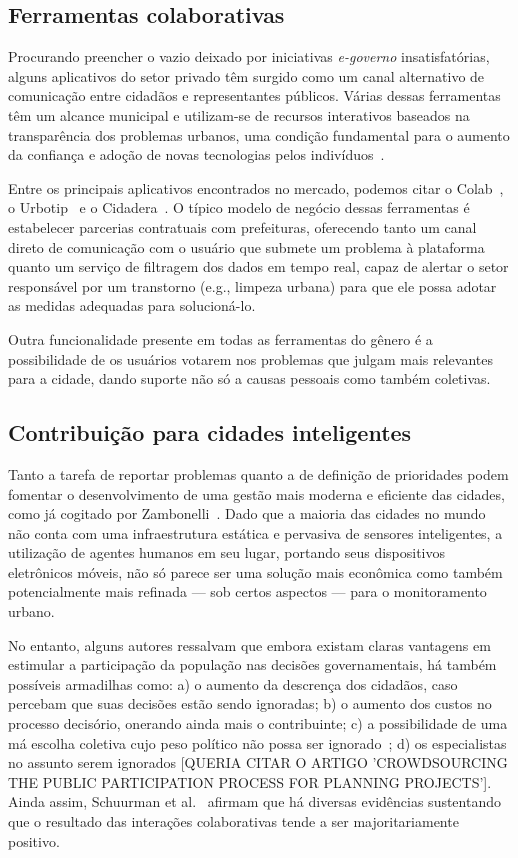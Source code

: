 \documentclass{sigchi}
\begin{document}
\subsection{Ferramentas colaborativas}
Procurando preencher o vazio deixado por iniciativas \textit{e-governo} insatisfatórias, alguns aplicativos do setor privado têm surgido como um canal alternativo de comunicação entre cidadãos e representantes públicos. Várias dessas ferramentas têm um alcance municipal e utilizam-se de recursos interativos baseados na transparência dos problemas urbanos, uma condição fundamental para o aumento da confiança e adoção de novas tecnologias pelos indivíduos~\cite{carter:2005}.

Entre os principais aplicativos encontrados no mercado, podemos citar o Colab~\cite{colab:2016}, o Urbotip~\cite{urbotip:2016} e o Cidadera~\cite{cidadera:2016}. O típico modelo de negócio dessas ferramentas é estabelecer parcerias contratuais com prefeituras, oferecendo tanto um canal direto de comunicação com o usuário que submete um problema à plataforma quanto um serviço de filtragem dos dados em tempo real, capaz de alertar o setor responsável por um transtorno (e.g., limpeza urbana) para que ele possa adotar as medidas adequadas para solucioná-lo.

Outra funcionalidade presente em todas as ferramentas do gênero é a possibilidade de os usuários votarem nos problemas que julgam mais relevantes para a cidade, dando suporte não só a causas pessoais como também coletivas. 

\subsection{Contribuição para cidades inteligentes}
Tanto a tarefa de reportar problemas quanto a de definição de prioridades podem fomentar o desenvolvimento de uma gestão mais moderna e eficiente das cidades, como já cogitado por Zambonelli~\cite{zambonelli:2011}. Dado que a maioria das cidades no mundo não conta com uma infraestrutura estática e pervasiva de sensores inteligentes, a utilização de agentes humanos em seu lugar, portando seus dispositivos eletrônicos móveis, não só parece ser uma solução mais econômica como também potencialmente mais refinada --- sob certos aspectos --- para o monitoramento urbano. 

No entanto, alguns autores ressalvam que embora existam claras vantagens em estimular a participação da população nas decisões governamentais, há também possíveis armadilhas como: a) o aumento da descrença dos cidadãos, caso percebam que suas decisões estão sendo ignoradas; b) o aumento dos custos no processo decisório, onerando ainda mais o contribuinte; c) a possibilidade de uma má escolha coletiva cujo peso político não possa ser ignorado~\cite{irvin:2004}; d) os especialistas no assunto serem ignorados [QUERIA CITAR O ARTIGO 'CROWDSOURCING THE PUBLIC PARTICIPATION PROCESS FOR PLANNING PROJECTS']. Ainda assim, Schuurman et al.~\cite{schuurman:2012} afirmam que há diversas evidências sustentando que o resultado das interações colaborativas tende a ser majoritariamente positivo.
\end{document}

